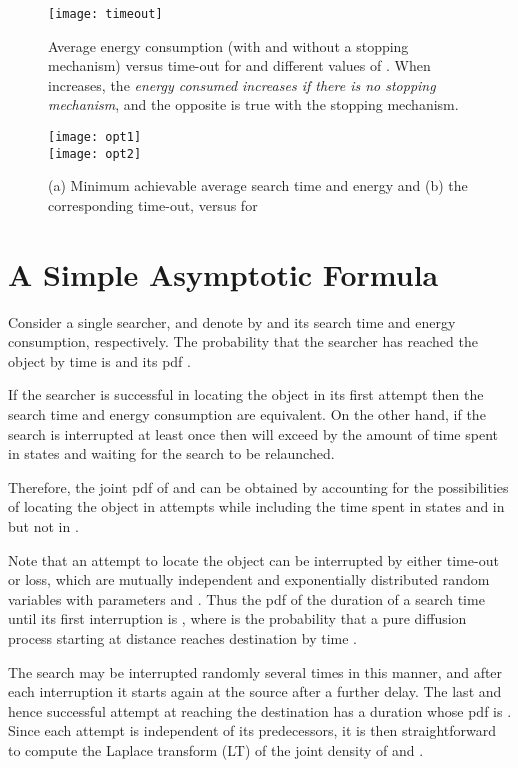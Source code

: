 \documentclass[journal]{IEEEtran}
\begin{document}
\begin{figure}[t]\centering
   \texttt{[image: timeout]}
   \caption{Average energy consumption (with and without a stopping mechanism) versus time-out  for  and different values of . When  increases, the {\em energy consumed increases if there is no stopping mechanism}, and the opposite is true with the stopping mechanism.}\label{timeout}
\end{figure}


\begin{figure}\centering
   \texttt{[image: opt1]}\\\vspace{0.2in}
   \texttt{[image: opt2]}
   \caption{(a) Minimum achievable average search time and energy and (b) the corresponding time-out, versus  for }\label{Opt}
\end{figure}




\section{A Simple Asymptotic Formula}  \label{asymptot1}

Consider a single searcher, and denote by  and  its search time and energy consumption, respectively. The probability that the searcher has reached the object by time  is  and its pdf .

If the searcher is successful in locating the object in its first attempt then the search time and energy consumption are equivalent. On the other hand, if the search is interrupted at least once then  will exceed  by the amount of time spent in states  and  waiting for the search to be relaunched.

Therefore, the joint pdf of  and  can be obtained by accounting for the possibilities of locating the object in  attempts while including the time spent in states  and  in  but not in .

Note that an attempt to locate the object can be interrupted by either time-out or loss, which are mutually independent and exponentially distributed random variables with parameters  and . Thus the pdf of the duration of a search time until its first interruption is , where  is the probability that a pure diffusion process starting at distance  reaches destination by time .

The search may be interrupted randomly several times in this manner, and after each interruption it starts again at the source after a further delay. The last and hence successful attempt at reaching the destination has a duration whose pdf is . Since each attempt is independent of its predecessors, it is then straightforward to compute the Laplace transform (LT) of the joint density of  and .
\end{document}
